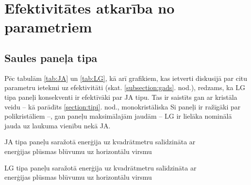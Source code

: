 \section{Efektivitātes atkarība no parametriem}
\subsection{Saules paneļa tipa} \label{subsection:tipi}

Pēc tabulām \ref{tab:JA} un \ref{tab:LG}, kā arī grafikiem, kas ietverti diskusijā par citu parametru ietekmi uz efektivitāti (skat. \ref{subsection:gads}. nod.), redzams, ka LG tipa paneļi konsekventi ir efektīvāki par JA tipu. Tas ir saistīts gan ar kristāla veidu -- kā parādīts \ref{section:tipi}. nod.,  monokristāliska Si paneļi ir ražīgāki par polikristāliem --, gan paneļu maksimālajām jaudām -- LG
ir lielāka nominālā jauda uz laukuma vienību nekā JA.

\begin{table}[!htbp]
    \caption{JA tipa paneļu saražotā enerģija uz kvadrātmetru salīdzināta ar\\ enerģijas plūsmas blūvumu uz horizontālu virsmu}
    \begin{center}
    
    \end{center} \label{tab:JA}
\end{table}
\begin{table}[!htbp]
    \caption{LG tipa paneļu saražotā enerģija uz kvadrātmetru salīdzināta ar\\ enerģijas plūsmas blūvumu uz horizontālu virsmu}
    \begin{center}
    
    \end{center} \label{tab:LG}
\end{table}


